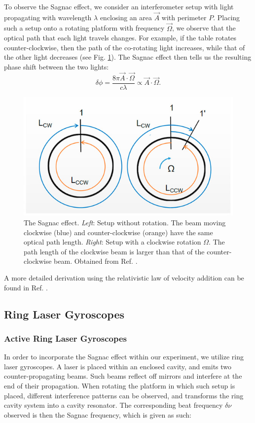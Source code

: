 \documentclass[a4paper]{report}
\numberwithin{equation}{section}
\begin{document}
To observe the Sagnac effect, we consider an interferometer setup with light propagating with wavelength $\lambda$ enclosing an area $\vec{A}$
 with perimeter $P$. Placing such a setup onto a rotating platform with frequency $\vec{\Omega}$, we observe that the optical path that
 each light travels changes. For example, if the table rotates counter-clockwise, then the path of the co-rotating light increases, while that of the other light
decreases (see Fig. \ref{fig:Sagnac_effect}). The Sagnac effect then tells us the resulting phase shift between the two lights:
\begin{equation}
	\delta \phi = \frac{8\pi \vec{A} \cdot \vec{\Omega}}{c \lambda} \propto \vec{A} \cdot \vec{\Omega}.
\end{equation} 

\begin{figure}[h!]
	\centering
	\includegraphics[width=0.6\columnwidth]{Sagnac_effect.jpg}
	\caption{The Sagnac effect. \textit{Left}: Setup without rotation. The beam moving clockwise (blue) and counter-clockwise (orange)
	have the same optical path length. \textit{Right}: Setup with a clockwise rotation $\Omega$. The path length of the 
	clockwise beam is larger than that of the counter-clockwise beam. Obtained from Ref. \cite{Feng2020}.}
	\label{fig:Sagnac_effect}
\end{figure}

A more detailed derivation using the relativistic law of velocity addition can be found in Ref. \cite{Benedetto2019}. 

\subsection{Ring Laser Gyroscopes}

\subsubsection{Active Ring Laser Gyroscopes}

In order to incorporate the Sagnac effect within our experiment, we utilize ring laser gyroscopes. A laser is placed within an 
enclosed cavity, and emits two counter-propagating beams. Such beams reflect off mirrors and interfere at the end of their 
propagation. When rotating the platform in which such setup is placed, different interference patterns can be observed, and 
transforms the ring cavity system into a cavity resonator. The corresponding beat frequency $\delta \nu$ observed is then the 
Sagnac frequency, which is given as such:
\end{document}
